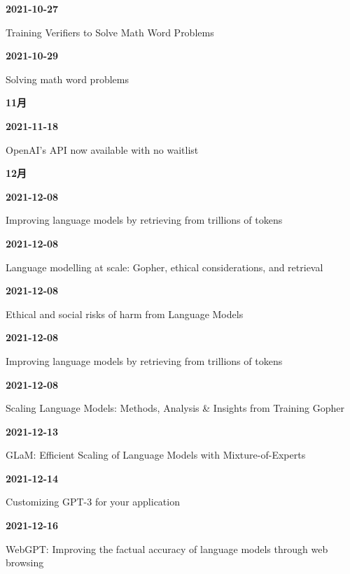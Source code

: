 \smallskip
\noindent\textbf{2021-10-27}\par
{\raggedright Training Verifiers to Solve Math Word Problems\,\cite{src-750bc3eeb1bc}\par}
\smallskip
\noindent\textbf{2021-10-29}\par
{\raggedright Solving math word problems\,\cite{src-34f845c1e710}\par}
\smallskip
\medskip
\noindent\textbf{11月}\par
\smallskip
\noindent\textbf{2021-11-18}\par
{\raggedright OpenAI’s API now available with no waitlist\,\cite{src-b50beb89f16f}\par}
\smallskip
\medskip
\noindent\textbf{12月}\par
\smallskip
\noindent\textbf{2021-12-08}\par
{\raggedright Improving language models by retrieving from trillions of tokens\,\cite{src-6ab2302937b2}\par}
\smallskip
\noindent\textbf{2021-12-08}\par
{\raggedright Language modelling at scale: Gopher, ethical considerations, and retrieval\,\cite{src-0028da50cfe5}\par}
\smallskip
\noindent\textbf{2021-12-08}\par
{\raggedright Ethical and social risks of harm from Language Models\,\cite{src-20fd9bba2e7a}\par}
\smallskip
\noindent\textbf{2021-12-08}\par
{\raggedright Improving language models by retrieving from trillions of tokens\,\cite{src-66643bb115ae}\par}
\smallskip
\noindent\textbf{2021-12-08}\par
{\raggedright Scaling Language Models: Methods, Analysis \& Insights from Training Gopher\,\cite{src-7652e568e428}\par}
\smallskip
\noindent\textbf{2021-12-13}\par
{\raggedright GLaM: Efficient Scaling of Language Models with Mixture-of-Experts\,\cite{src-d15ca2441916}\par}
\smallskip
\noindent\textbf{2021-12-14}\par
{\raggedright Customizing GPT-3 for your application\,\cite{chron-e6c9dffd1960}\par}
\smallskip
\noindent\textbf{2021-12-16}\par
{\raggedright WebGPT: Improving the factual accuracy of language models through web browsing\,\cite{src-bb1464aabad9}\par}
